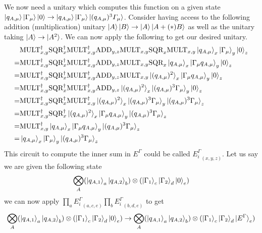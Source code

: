 \documentclass{article}
\begin{document}
We now need a unitary which computes this function on a given state $\ket{q_{A,\mu}}\ket{\Gamma_\mu}\ket{0} \to \ket{q_{A,\mu}}\ket{\Gamma_\mu}\ket{(q_{A,\mu})^3\varGamma_{\mu}}$. 
Consider having access to the following addition (multiplication) unitary $\ket{A}\ket{B} \to \ket{A}\ket{A+(*)B}$ as well as the unitary taking $\ket{A} \to \ket{A^2}$. 
We can now apply the following to get our desired unitary.  
\begin{align}
    &\text{MULT}^\dagger_{x,y}\text{SQR}^\dagger_x\text{MULT}^\dagger_{x,y}\text{ADD}_{y,z}\text{MULT}_{x,y}\text{SQR}_x\text{MULT}_{x,y}\ket{q_{A,\mu}}_x\ket{\Gamma_\mu}_y\ket{0}_z\\ 
    = &\text{MULT}^\dagger_{x,y}\text{SQR}^\dagger_x\text{MULT}^\dagger_{x,y}\text{ADD}_{y,z}\text{MULT}_{x,y}\text{SQR}_x\ket{q_{A,\mu}}_x\ket{\Gamma_\mu q_{A,\mu}}_y\ket{0}_z\\ 
    = &\text{MULT}^\dagger_{x,y}\text{SQR}^\dagger_x\text{MULT}^\dagger_{x,y}\text{ADD}_{y,z}\text{MULT}_{x,y}\ket{(q_{A,\mu})^2}_x\ket{\Gamma_\mu q_{A,\mu}}_y\ket{0}_z\\ 
    = &\text{MULT}^\dagger_{x,y}\text{SQR}^\dagger_x\text{MULT}^\dagger_{x,y}\text{ADD}_{y,z}\ket{(q_{A,\mu})^2}_x\ket{(q_{A,\mu})^3\Gamma_\mu}_y\ket{0}_z\\ 
    = &\text{MULT}^\dagger_{x,y}\text{SQR}^\dagger_x\text{MULT}^\dagger_{x,y}\ket{(q_{A,\mu})^2}_x\ket{(q_{A,\mu})^3\Gamma_\mu }_y\ket{(q_{A,\mu})^3\Gamma_\mu}_z\\ 
    = &\text{MULT}^\dagger_{x,y}\text{SQR}^\dagger_x\ket{(q_{A,\mu})^2}_x\ket{\Gamma_\mu q_{A,\mu}}_y\ket{(q_{A,\mu})^3\Gamma_\mu}_z\\ 
    = &\text{MULT}^\dagger_{x,y}\ket{q_{A,\mu}}_x\ket{\Gamma_\mu q_{A,\mu}}_y\ket{(q_{A,\mu})^3\Gamma_\mu}_z\\ 
    = &\ket{q_{A,\mu}}_x\ket{\Gamma_\mu}_y\ket{(q_{A,\mu})^3\Gamma_\mu }_z\\ 
\end{align}
This circuit to compute the inner sum in $E^\Gamma$ could be called ${E_i^\Gamma}_{(x,y,z)}$. Let us say we are given the following state $$\bigotimes_A(\ket{q_{A,1}}_a\ket{q_{A,2}}_b)\otimes(\ket{\Gamma_1}_c\ket{\Gamma_2}_d\ket{0}_e)$$ 
we can now apply $\prod_{a} {E_i^\Gamma}_{(a,c,e)}\prod_{b} {E_i^\Gamma}_{(b,d,e)}$ to get 
$$\bigotimes_A(\ket{q_{A,1}}_a\ket{q_{A,2}}_b)\otimes(\ket{\Gamma_1}_c\ket{\Gamma_2}_d\ket{0}_e) \to \bigotimes_A(\ket{q_{A,1}}_a\ket{q_{A,2}}_b)\otimes(\ket{\Gamma_1}_c\ket{\Gamma_2}_d\ket{E^\Gamma}_e)$$
\end{document}
